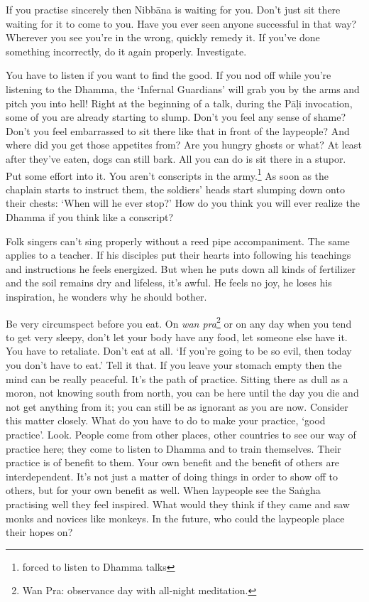 If you practise sincerely then Nibb\=ana is waiting for you. Don't just sit there waiting for it to come to you. Have you ever seen anyone successful in that way? Wherever you see you're in the wrong, quickly remedy it. If you've done something incorrectly, do it again properly. Investigate.

You have to listen if you want to find the good. If you nod off while you're listening to the Dhamma, the `Infernal Guardians' will grab you by the arms and pitch you into hell! Right at the beginning of a talk, during the P\=a\d{l}i invocation, some of you are already starting to slump. Don't you feel any sense of shame? Don't you feel embarrassed to sit there like that in front of the laypeople? And where did you get those appetites from? Are you hungry ghosts or what? At least after they've eaten, dogs can still bark. All you can do is sit there in a stupor. Put some effort into it. You aren't conscripts in the army.\footnote{forced to listen to Dhamma talks} As soon as the chaplain starts to instruct them, the soldiers' heads start slumping down onto their chests: `When will he ever stop?' How do you think you will ever realize the Dhamma if you think like a conscript?

Folk singers can't sing properly without a reed pipe accompaniment. The same applies to a teacher. If his disciples put their hearts into following his teachings and instructions he feels energized. But when he puts down all kinds of fertilizer and the soil remains dry and lifeless, it's awful. He feels no joy, he loses his inspiration, he wonders why he should bother.

Be very circumspect before you eat. On \textit{wan pra}\footnote{Wan Pra: observance day with all-night meditation.} or on any day when you tend to get very sleepy, don't let your body have any food, let someone else have it. You have to retaliate. Don't eat at all. `If you're going to be so evil, then today you don't have to eat.' Tell it that. If you leave your stomach empty then the mind can be really peaceful. It's the path of practice. Sitting there as dull as a moron, not knowing south from north, you can be here until the day you die and not get anything from it; you can still be as ignorant as you are now. Consider this matter closely. What do you have to do to make your practice, `good practice'. Look. People come from other places, other countries to see our way of practice here; they come to listen to Dhamma and to train themselves. Their practice is of benefit to them. Your own benefit and the benefit of others are interdependent. It's not just a matter of doing things in order to show off to others, but for your own benefit as well. When laypeople see the Sa\.ngha practising well they feel inspired. What would they think if they came and saw monks and novices like monkeys. In the future, who could the laypeople place their hopes on?


